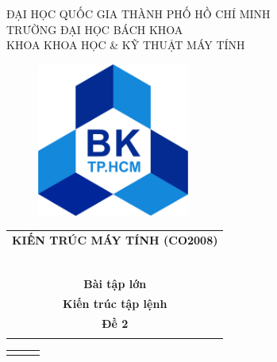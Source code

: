 \documentclass[a4paper]{article}
\theoremstyle{definition}
\begin{document}
\begin{titlepage}
\begin{center}
ĐẠI HỌC QUỐC GIA THÀNH PHỐ HỒ CHÍ MINH \\
TRƯỜNG ĐẠI HỌC BÁCH KHOA \\
KHOA KHOA HỌC \& KỸ THUẬT MÁY TÍNH 
\end{center}

\vspace{1cm}

\begin{figure}[h!]
\begin{center}
\includegraphics[width=5cm]{image/hcmut.png}
\end{center}
\end{figure}

\vspace{1cm}


\begin{center}
\begin{tabular}{c}
\multicolumn{1}{l}{\textbf{{\Large \hspace{2cm}KIẾN TRÚC MÁY TÍNH (CO2008)}}}\\
~~\\
\hline
\\
\textbf{\Large Bài tập lớn} \\
\textbf{\Large Kiến trúc tập lệnh } \\
\textbf{\Large Đề 2} \\
\\
\hline
\end{tabular}
\end{center}

\vspace{0.5cm}

\begin{table}[h]
\begin{tabular}{rrl}

\hspace{3.5 cm} & \color{black}{GVHD:} & \color{black}{NGUYỄN XUÂN MINH}\\ 


\end{tabular}
\end{table}
\end{titlepage}
\end{document}
